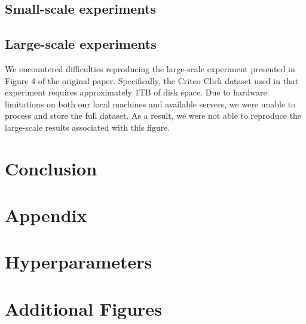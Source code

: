 \documentclass[a4paper,twocolumn]{article} %
\begin{document}
\subsection{ Small-scale experiments}

\subsection{ Large-scale experiments}
We encountered difficulties reproducing the large-scale experiment presented in Figure 4 of the original paper. Specifically, the Criteo Click dataset used in that experiment requires approximately 1TB of disk space. 
Due to hardware limitations on both our local machines and available servers, we were unable to process and store the full dataset. 
As a result, we were not able to reproduce the large-scale results associated with this figure.

\section{Conclusion}





\clearpage
\appendix
\section*{Appendix}
\section{Hyperparameters}

\section{Additional Figures}
\end{document}
